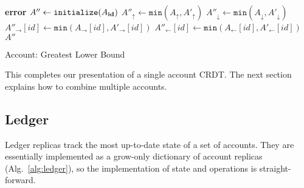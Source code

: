 \documentclass[9pt]{article}   	%
\begin{document}
\begin{algorithm}
\begin{algorithmic}[1]
     
		\textbf{error}
	\EndIf
	\State
        \State $A'' \leftarrow \texttt{initialize}(A_{\footnotesize \textbf{id}})$
        \State $A''_\uparrow \leftarrow \texttt{min}(A_\uparrow, A'_\uparrow)$
        \State $A''_\downarrow \leftarrow \texttt{min}(A_\downarrow, A'_\downarrow)$ 
	 
		\State $A''_{\rightarrow}[id] \leftarrow \texttt{min}(A_{\rightarrow}[id], A'_{\rightarrow}[id])$
	\EndFor
	 
		\State $A''_{\leftarrow}[id] \leftarrow \texttt{min}(A_{\leftarrow}[id], A'_{\leftarrow}[id])$
	\EndFor
	\State \Return $A''$	
    \EndFunction
\end{algorithmic}
\caption{\label{alg:account-hlb} Account: Greatest Lower Bound}
\end{algorithm}

This completes our presentation of a single account CRDT. The next section explains how to combine multiple accounts.



\subsection{Ledger}
\label{sec:ledger}

Ledger replicas track the most up-to-date state of a set of accounts. They are essentially implemented as a grow-only dictionary of account replicas (Alg.~\ref{alg:ledger}), so the implementation of state and operations is straight-forward.
\end{document}
